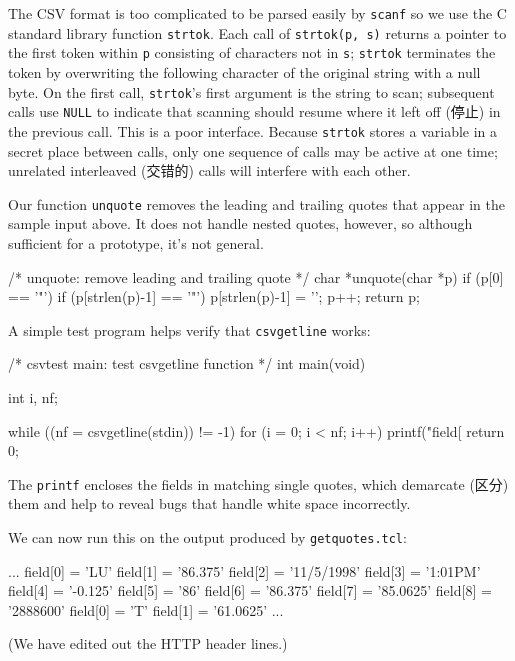 The CSV format is too complicated to be parsed easily by \verb'scanf' so we
use the C standard library function \verb'strtok'. Each call of
\verb'strtok(p, s)' returns a pointer to the first token within \verb'p'
consisting of characters not in \verb's'; \verb'strtok' terminates the
token by overwriting the following character of the original string with a
null byte. On the first call, \verb'strtok''s first argument is the string
to scan; subsequent calls use \verb'NULL' to indicate that scanning should
resume where it left off (停止) in the previous call.  This is a poor
interface. Because \verb'strtok' stores a variable in a secret place
between calls, only one sequence of calls may be active at one time;
unrelated interleaved (交错的) calls will interfere with each other.

Our function \verb'unquote' removes the leading and trailing quotes that
appear in the sample input above. It does not handle nested quotes,
however, so although sufficient for a prototype, it's not general.
\begin{badcode}
    /* unquote: remove leading and trailing quote */
    char *unquote(char *p)
    {
        if (p[0] == '"') {
            if (p[strlen(p)-1] == '"')
                p[strlen(p)-1] = '\0';
            p++;
        }
        return p;
    }
\end{badcode}

A simple test program helps verify that \verb'csvgetline' works:
\begin{badcode}
    /* csvtest main: test csvgetline function */
    int main(void)
    {
        int i, nf;

        while ((nf = csvgetline(stdin)) != -1)
            for (i = 0; i < nf; i++)
                printf("field[%
            return 0;
    }
\end{badcode}
The \verb'printf' encloses the fields in matching single quotes, which
demarcate (区分) them and
help to reveal bugs that handle white space incorrectly.

We can now run this on the output produced by \verb'getquotes.tcl':
\begin{wellcode}
    ...
    field[0] = 'LU'
    field[1] = '86.375'
    field[2] = '11/5/1998'
    field[3] = '1:01PM'
    field[4] = '-0.125'
    field[5] = '86'
    field[6] = '86.375'
    field[7] = '85.0625'
    field[8] = '2888600'
    field[0] = 'T'
    field[1] = '61.0625'
    ...
\end{wellcode}
(We have edited out the HTTP header lines.)


